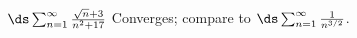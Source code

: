{$\ds \sum_{n=1}^\infty \frac{\sqrt{n}+3}{n^2+17}$
}
{Converges; compare to $\ds \sum_{n=1}^\infty \frac {1}{n^{3/2}}$. 
}